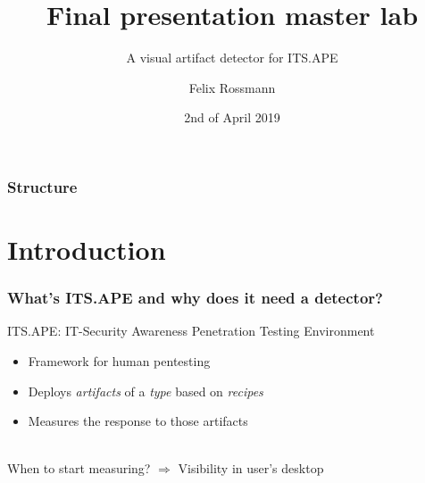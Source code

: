 \documentclass[xcolor=dvipsnames]{beamer}
\title{Final presentation master lab}
\subtitle{A visual artifact detector for ITS.APE}
\author{Felix Rossmann}
\date{2nd of April 2019}
\begin{document}
	\begin{frame}
		\titlepage
	\end{frame}
	
	\begin{frame}
		\frametitle{Structure}
		\tableofcontents
	\end{frame}
	
	\section{Introduction} 
	\begin{frame}
		\frametitle{What's ITS.APE and why does it need a detector?}
		ITS.APE: IT-Security Awareness Penetration Testing Environment
		
		\begin{itemize}
			\item Framework for human pentesting \cite{itsape}
			\pause
			\item Deploys \emph{artifacts} of a \emph{type} based on \emph{recipes}
			\item Measures the response to those artifacts
		\end{itemize}
		\pause
		\vspace*{1cm}~\\
		When to start measuring? $\Rightarrow$ Visibility in user's desktop
	\end{frame}
	
\end{document}
